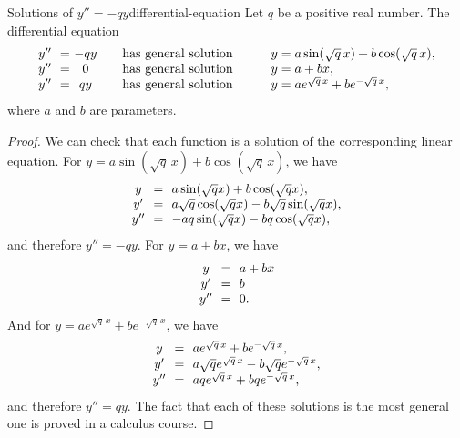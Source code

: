 \begin{theorem}{Solutions of $y''=-qy$}{differential-equation}
  Let $q$ be a positive real number.  The differential equation
  \begin{equation*}
    \begin{array}{l@{~~}l@{~}clll}
    y'' &=& -qy &\quad\mbox{has general solution}\quad\quad &
    y = a\sin(\sqrt{q}\,x) + b\cos(\sqrt{q}\,x),\\
    y'' &=& 0 &\quad\mbox{has general solution}\quad &
    y = a + bx, \\
    y'' &=& qy &\quad\mbox{has general solution}\quad &
    y = ae^{\sqrt{q}\,x} + be^{-\sqrt{q}\,x}, \\
    \end{array}
  \end{equation*}
  where $a$ and $b$ are parameters.
\end{theorem}

\begin{proof}
  We can check that each function is a solution of the corresponding
  linear equation. For $y = a\sin(\sqrt{q}\,x) + b\cos(\sqrt{q}\,x)$,
  we have
  \begin{equation*}
    \begin{array}{c@{~~}c@{~~}l}
      y &=& a\sin(\sqrt{q}x) + b\cos(\sqrt{q}x), \\
      y' &=& a\sqrt{q}\cos(\sqrt{q}x) - b\sqrt{q}\sin(\sqrt{q}x), \\
      y'' &=& -aq\sin(\sqrt{q}x) - bq\cos(\sqrt{q}x), \\
    \end{array}
  \end{equation*}
  and therefore $y''=-qy$. For $y=a+bx$, we have
  \begin{equation*}
    \begin{array}{c@{~~}c@{~~}l}
      y &=& a + bx \\
      y' &=& b \\
      y'' &=& 0.
    \end{array}
  \end{equation*}
  And for $y = ae^{\sqrt{q}\,x} + be^{-\sqrt{q}\,x}$, we have
  \begin{equation*}
    \begin{array}{c@{~~}c@{~~}l}
      y &=& ae^{\sqrt{q}\,x} + be^{-\sqrt{q}\,x}, \\
      y' &=& a\sqrt{q}e^{\sqrt{q}\,x} - b\sqrt{q}e^{-\sqrt{q}\,x}, \\
      y'' &=& aqe^{\sqrt{q}\,x} + bqe^{-\sqrt{q}\,x}, \\
    \end{array}
  \end{equation*}
  and therefore $y''=qy$. The fact that each of these solutions is the
  most general one is proved in a calculus course.
\end{proof}

